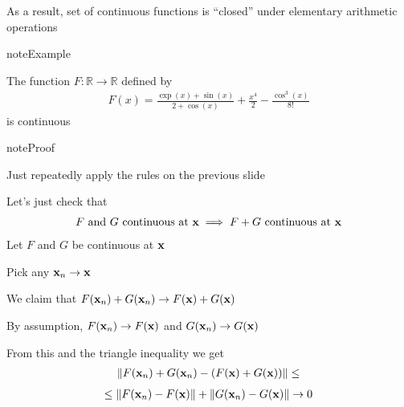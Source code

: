 \documentclass[letterpaper,10pt,english]{jupyterBook}
\begin{document}
\sphinxAtStartPar
As a result, set of continuous functions is “closed” under elementary
arithmetic operations

\begin{sphinxadmonition}{note}{Example}

\sphinxAtStartPar
The function \(F \colon \mathbb{R} \to \mathbb{R}\) defined by
\begin{equation*}
\begin{split}
F(x) = \frac{\exp(x) + \sin(x)}{2 + \cos(x)} + \frac{x^4}{2}
- \frac{\cos^3(x)}{8!}
\end{split}
\end{equation*}
\sphinxAtStartPar
is continuous
\end{sphinxadmonition}

\begin{sphinxadmonition}{note}{Proof}

\sphinxAtStartPar
Just repeatedly apply the rules on the previous slide

\sphinxAtStartPar
Let’s just check that
\begin{equation*}
\begin{split}
\text{$F$ and $G$ continuous at ${\bf x}$}
\implies 
\text{$F + G$ continuous at ${\bf x}$}
\end{split}
\end{equation*}
\sphinxAtStartPar
Let \(F\) and \(G\) be continuous at \({\bf x}\)

\sphinxAtStartPar
Pick any \({\bf x}_n \to {\bf x}\)

\sphinxAtStartPar
We claim that
\(F({\bf x}_n) + G({\bf x}_n) \to F({\bf x}) + G({\bf x})\)

\sphinxAtStartPar
By assumption, \(F({\bf x}_n) \to F({\bf x})\) and \(G({\bf x}_n) \to G({\bf x})\)

\sphinxAtStartPar
From this and the triangle inequality we get
\begin{equation*}
\begin{split}
\| F({\bf x}_n) + G({\bf x}_n) - (F({\bf x}) + G({\bf x})) \|
\leq 
\end{split}
\end{equation*}\begin{equation*}
\begin{split}
\leq 
\| F({\bf x}_n) - F({\bf x}) \|
+
\| G({\bf x}_n) - G({\bf x}) \|
\to 0
\end{split}
\end{equation*}\end{sphinxadmonition}
\end{document}
